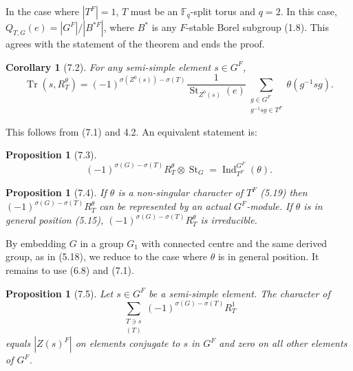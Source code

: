 \documentclass[11pt]{amsart}
\theoremstyle{plain}
\newtheorem{proposition}[theorem]{Proposition}
\newtheorem{corollary}[theorem]{Corollary}
\theoremstyle{remark}
\DeclareMathOperator{\Ind}{Ind}
\DeclareMathOperator{\Tr}{Tr}
\DeclareMathOperator{\St}{St}
\begin{document}
In the case where $|T^F| = 1$, $T$ must be an $\mathbb{F}_q$-split torus and $q = 2$. In this case, $Q_{T,G}(e) = |G^F|/|B^{*F}|$, where $B^*$ is any $F$-stable Borel subgroup (1.8). This agrees with the statement of the theorem and ends the proof.

\begin{corollary}[7.2]
For any semi-simple element $s \in G^F$,
\[
\Tr(s, R_T^\theta) = (-1)^{\sigma(Z^0(s)) - \sigma(T)} \frac{1}{\St_{Z^0(s)}(e)} \sum_{\substack{g \in G^F \\ g^{-1}sg \in T^F}} \theta(g^{-1}sg).
\]
\end{corollary}

This follows from (7.1) and 4.2. An equivalent statement is:

\begin{proposition}[7.3]
\[
(-1)^{\sigma(G) - \sigma(T)} R_T^\theta \otimes \St_G = \Ind_{T^F}^{G^F}(\theta).
\]
\end{proposition}

\begin{proposition}[7.4]
If $\theta$ is a non-singular character of $T^F$ (5.19) then $(-1)^{\sigma(G) - \sigma(T)} R_T^\theta$ can be represented by an actual $G^F$-module. If $\theta$ is in general position (5.15), $(-1)^{\sigma(G) - \sigma(T)} R_T^\theta$ is irreducible.
\end{proposition}

By embedding $G$ in a group $G_1$ with connected centre and the same derived group, as in (5.18), we reduce to the case where $\theta$ is in general position. It remains to use (6.8) and (7.1).

\begin{proposition}[7.5]
Let $s \in G^F$ be a semi-simple element. The character of
\begin{equation}\label{eq:7.5.1}
\sum_{\substack{T \ni s \\ (T)}} (-1)^{\sigma(G) - \sigma(T)} R_T^1
\end{equation}
equals $|Z(s)^F|$ on elements conjugate to $s$ in $G^F$ and zero on all other elements of $G^F$.
\end{proposition}
\end{document}
